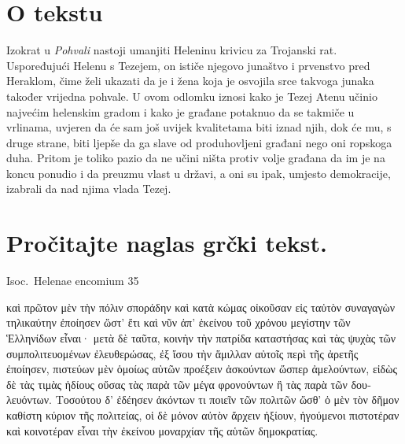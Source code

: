 


\section*{O tekstu}

Izokrat u \textit{Pohvali} nastoji umanjiti Heleninu krivicu za Trojanski rat. Uspoređujući Helenu s Tezejem, on ističe njegovo junaštvo i prvenstvo pred Heraklom, čime želi ukazati da je i žena koja je osvojila srce takvoga junaka također vrijedna pohvale. U ovom odlomku iznosi kako je Tezej Atenu učinio najvećim helenskim gradom i kako je građane potaknuo da se takmiče u vrlinama, uvjeren da će sam još uvijek kvalitetama biti iznad njih, dok će mu, s druge strane, biti ljepše da ga slave od produhovljeni građani nego oni ropskoga duha. Pritom je toliko pazio da ne učini ništa protiv volje građana da im je na koncu  ponudio i da preuzmu vlast u državi, a oni su ipak, umjesto demokracije, izabrali da nad njima vlada Tezej.


\section*{Pročitajte naglas grčki tekst.}

Isoc.\ Helenae encomium 35


\medskip

\begin{greek}
{\large

\noindent καὶ πρῶτον μὲν τὴν πόλιν σποράδην καὶ κατὰ κώμας οἰκοῦσαν εἰς ταὐτὸν συναγαγὼν τηλικαύτην ἐποίησεν ὥστ' ἔτι καὶ νῦν ἀπ' ἐκείνου τοῦ χρόνου μεγίστην τῶν Ἑλληνίδων εἶναι· μετὰ δὲ ταῦτα, κοινὴν τὴν πατρίδα καταστήσας καὶ τὰς ψυχὰς τῶν συμπολιτευομένων ἐλευθερώσας, ἐξ ἴσου τὴν ἅμιλλαν αὐτοῖς περὶ τῆς ἀρετῆς ἐποίησεν, πιστεύων μὲν ὁμοίως αὐτῶν προέξειν ἀσκούντων ὥσπερ ἀμελούντων, εἰδὼς δὲ τὰς τιμὰς ἡδίους οὔσας τὰς παρὰ τῶν μέγα φρονούντων ἢ τὰς παρὰ τῶν δουλευόντων. Τοσούτου δ' ἐδέησεν ἀκόντων τι ποιεῖν τῶν πολιτῶν ὥσθ' ὁ μὲν τὸν δῆμον καθίστη κύριον τῆς πολιτείας, οἱ δὲ μόνον αὐτὸν ἄρχειν ἠξίουν, ἡγούμενοι πιστοτέραν καὶ κοινοτέραν εἶναι τὴν ἐκείνου μοναρχίαν τῆς αὑτῶν δημοκρατίας.


}
\end{greek}

